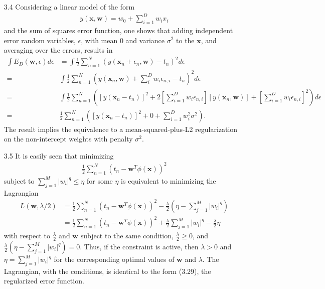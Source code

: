 \documentclass[]{article}
\begin{document}
\begin{enumerate}
	\item[3.4] Considering a linear model of the form
	\begin{align*}
	y(\mathbf{x}, \mathbf{w}) = w_0 + \sum_{i=1}^{D} w_i x_i
	\end{align*}
	and the sum of squares error function, one shows that adding independent error random variables, $\epsilon$, with mean 0 and variance $\sigma^2$ to the $\mathbf{x}$, and averaging over the errors, results in
	\begin{align*}
	\int E_D(\mathbf{w}, \epsilon)d\epsilon &=  \int \frac{1}{2} \sum_{n=1}^{N} \left( y(\mathbf{x}_n + \epsilon_n, \mathbf{w}) -t_n \right)^2 d \epsilon \\
	=& \int \frac{1}{2} \sum_{n=1}^{N} \left( y(\mathbf{x}_n, \mathbf{w}) + \sum_{i}^{D} w_i \epsilon_{n,i} - t_n \right)^2 d \epsilon \\
	=& \int \frac{1}{2} \sum_{n=1}^{N} \left( \left[ y(\mathbf{x}_n - t_n) \right]^2 + 2 \left[ \sum_{i=1}^{D}w_i \epsilon_{n,i} \right] \left[ y(\mathbf{x}_n, \mathbf{w}) \right] + \left[ \sum_{i=1}^{D}w_i \epsilon_{n,i} \right]^2 \right) d \epsilon \\
	=& \frac{1}{2} \sum_{n=1}^{N}  \left( \left[ y(\mathbf{x}_n - t_n) \right]^2 +  0 + \sum_{i=1}^{D}w_i^2 \sigma^2 \right).
	\end{align*}
	The result implies the equivalence to a mean-squared-plus-L2 regularization on the non-intercept weights with penalty $\sigma^2$.
	\item[3.5] It is easily seen that minimizing
	\begin{align*}
	\frac{1}{2} \sum_{n=1}^{N}(t_n - \mathbf{w}^T \phi(\mathbf{x}))^2
	\end{align*}
	subject to $\sum_{j=1}^{M}|w_i|^q \leq \eta$ for some $\eta$ is equivalent to minimizing the Lagrangian
	\begin{align*}
	L(\mathbf{w}, \lambda/2) &= \frac{1}{2} \sum_{n=1}^{N}(t_n - \mathbf{w}^T \phi(\mathbf{x}))^2 - \frac{\lambda}{2}\left(\eta - \sum_{j=1}^{M}|w_i|^q \right) \\
	&= \frac{1}{2} \sum_{n=1}^{N}(t_n - \mathbf{w}^T \phi(\mathbf{x}))^2 + \frac{\lambda}{2}\sum_{j=1}^{M}|w_i|^q - \frac{\lambda}{2}\eta
	\end{align*}
	with respect to $\frac{\lambda}{2}$ and $\mathbf{w}$ subject to the same condition, $\frac{\lambda}{2}\geq0$, and $\frac{\lambda}{2}\left(\eta - \sum_{j=1}^{M}|w_i|^q \right)=0$. Thus, if the constraint is active, then $\lambda>0$ and $\eta = \sum_{j=1}^{M}|w_i|^q$ for the corresponding optimal values of $\mathbf{w}$ and $\lambda$. The Lagrangian, with the conditions, is identical to the form (3.29), the regularized error function.

\end{enumerate}
\end{document}
